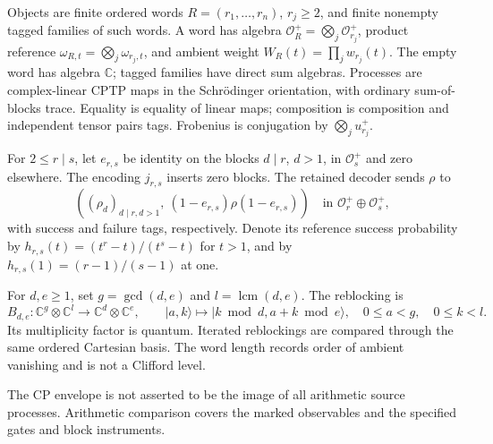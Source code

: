 \begin{definition}
Objects are finite ordered words $R=(r_1,\ldots,r_n)$, $r_j\geq2$, and
finite nonempty tagged families of such words. A word has algebra
$\mathcal O_R^+=\bigotimes_j\mathcal O_{r_j}^+$, product reference
$\omega_{R,t}=\bigotimes_j\omega_{r_j,t}$, and ambient weight
$W_R(t)=\prod_j w_{r_j}(t)$. The empty word has algebra $\mathbb C$;
tagged families have direct sum algebras. Processes are complex-linear
CPTP maps in the Schr\"odinger orientation, with ordinary sum-of-blocks
trace. Equality is equality of linear maps; composition is composition
and independent tensor pairs tags. Frobenius is conjugation by
$\bigotimes_j u_{r_j}^+$.

For $2\leq r\mid s$, let $e_{r,s}$ be identity on the blocks $d\mid r$,
$d>1$, in $\mathcal O_s^+$ and zero elsewhere. The encoding $j_{r,s}$
inserts zero blocks. The retained decoder sends $\rho$ to
\[
 \left((\rho_d)_{d\mid r,d>1},\ (1-e_{r,s})\rho(1-e_{r,s})\right)
 \quad\text{in }\mathcal O_r^+\oplus\mathcal O_s^+,
\]
with success and failure tags, respectively. Denote its reference success
probability by $h_{r,s}(t)=(t^r-t)/(t^s-t)$ for $t>1$, and by
$h_{r,s}(1)=(r-1)/(s-1)$ at one.

For $d,e\geq1$, set $g=\gcd(d,e)$ and $l=\operatorname{lcm}(d,e)$.
The reblocking is
\[
 B_{d,e}:\mathbb C^g\otimes\mathbb C^l\longrightarrow
                  \mathbb C^d\otimes\mathbb C^e,
 \qquad |a,k\rangle\longmapsto|k\bmod d,a+k\bmod e\rangle,
 \quad 0\leq a<g,\quad0\leq k<l.
\]
Its multiplicity factor is quantum. Iterated reblockings are compared
through the same ordered Cartesian basis. The word length records order
of ambient vanishing and is not a Clifford level.
\end{definition}
\begin{scope}
The CP envelope is not asserted to be the image of all arithmetic source
processes. Arithmetic comparison covers the marked observables and the
specified gates and block instruments.
\end{scope}

